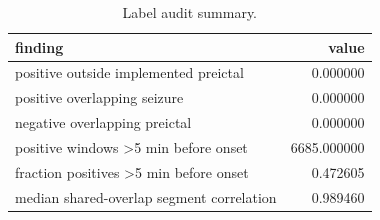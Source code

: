 \begin{table}
\caption{Label audit summary.}
\label{tab:label_audit_summary_table}
\begin{tabular}{lr}
\toprule
finding & value \\
\midrule
positive outside implemented preictal & 0.000000 \\
positive overlapping seizure & 0.000000 \\
negative overlapping preictal & 0.000000 \\
positive windows >5 min before onset & 6685.000000 \\
fraction positives >5 min before onset & 0.472605 \\
median shared-overlap segment correlation & 0.989460 \\
\bottomrule
\end{tabular}
\end{table}
